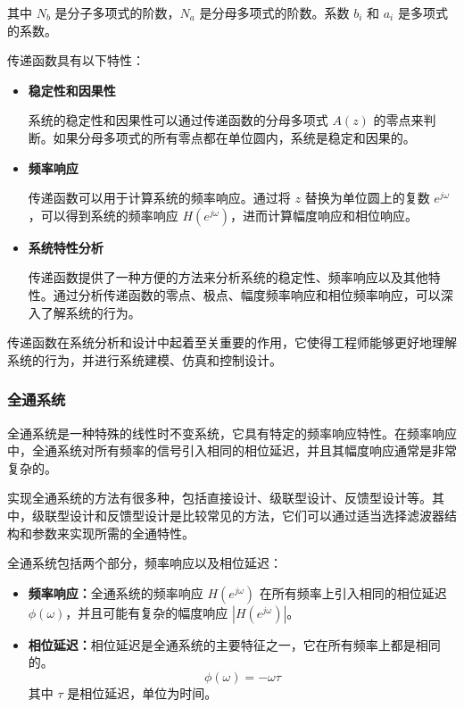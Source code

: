 \documentclass[a4paper,12pt]{article}
\begin{document}
其中 \( N_b \) 是分子多项式的阶数，\( N_a \) 是分母多项式的阶数。系数 \( b_i \) 和 \( a_i \) 是多项式的系数。

传递函数具有以下特性：
\begin{itemize}
    \item \textbf{稳定性和因果性}

    系统的稳定性和因果性可以通过传递函数的分母多项式 \( A(z) \) 的零点来判断。如果分母多项式的所有零点都在单位圆内，系统是稳定和因果的。

    \item \textbf{频率响应}

    传递函数可以用于计算系统的频率响应。通过将 \( z \) 替换为单位圆上的复数 \( e^{j\omega} \)，可以得到系统的频率响应 \( H(e^{j\omega}) \)，进而计算幅度响应和相位响应。

    \item \textbf{系统特性分析}

    传递函数提供了一种方便的方法来分析系统的稳定性、频率响应以及其他特性。通过分析传递函数的零点、极点、幅度频率响应和相位频率响应，可以深入了解系统的行为。
\end{itemize}

传递函数在系统分析和设计中起着至关重要的作用，它使得工程师能够更好地理解系统的行为，并进行系统建模、仿真和控制设计。

\subsubsection{全通系统}
全通系统是一种特殊的线性时不变系统，它具有特定的频率响应特性。在频率响应中，全通系统对所有频率的信号引入相同的相位延迟，并且其幅度响应通常是非常复杂的。

实现全通系统的方法有很多种，包括直接设计、级联型设计、反馈型设计等。其中，级联型设计和反馈型设计是比较常见的方法，它们可以通过适当选择滤波器结构和参数来实现所需的全通特性。

全通系统包括两个部分，频率响应以及相位延迟：

\begin{itemize}
    \item \textbf{频率响应：}全通系统的频率响应 \( H(e^{j\omega}) \) 在所有频率上引入相同的相位延迟 \( \phi(\omega) \)，并且可能有复杂的幅度响应 \( |H(e^{j\omega})| \)。

    \item \textbf{相位延迟：}相位延迟是全通系统的主要特征之一，它在所有频率上都是相同的。
    \begin{equation}
        \phi(\omega) = -\omega \tau
    \end{equation}
    其中 \( \tau \) 是相位延迟，单位为时间。
    
\end{itemize}
\end{document}
